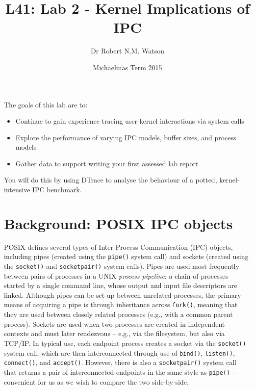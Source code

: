 \documentclass[a4paper,10pt]{article}
\begin{document}
\title{L41: Lab 2 - Kernel Implications of IPC}
\author{Dr Robert N.M. Watson}
\date{Michaelmas Term 2015}
\maketitle

%
%
%

\noindent
The goals of this lab are to:

\begin{itemize}
\item Continue to gain experience tracing user-kernel interactions via system calls
\item Explore the performance of varying IPC models, buffer sizes, and process models
\item Gather data to support writing your first assessed lab report
\end{itemize}

\noindent
You will do this by using DTrace to analyse the behaviour of a potted,
kernel-intensive IPC benchmark.

\section*{Background: POSIX IPC objects}

POSIX defines several types of Inter-Process Communication (IPC) objects,
including pipes (created using the \texttt{pipe()} system call) and sockets
(created using the \texttt{socket()} and \texttt{socketpair()} system calls).
Pipes are used most frequently between pairs of processes in a UNIX
\textit{process pipeline}: a chain of processes started by a single command
line, whose output and input file descriptors are linked.
Although pipes can be set up between unrelated processes, the primary means of
acquiring a pipe is through inheritance across \texttt{fork()}, meaning that
they are used between closely related processes (e.g., with a common parent
process).
Sockets are used when two processes are created in independent contexts and
must later rendezvous -- e.g., via the filesystem, but also via TCP/IP.
In typical use, each endpoint process creates a socket via the
\texttt{socket()} system call, which are then interconnected through use of
\texttt{bind()}, \texttt{listen()}, \texttt{connect()}, and \texttt{accept()}.
However, there is also a \texttt{socketpair()} system call that returns a pair
of interconnected endpoints in the same style as \texttt{pipe()} -- convenient
for us as we wish to compare the two side-by-side.
\end{document}
